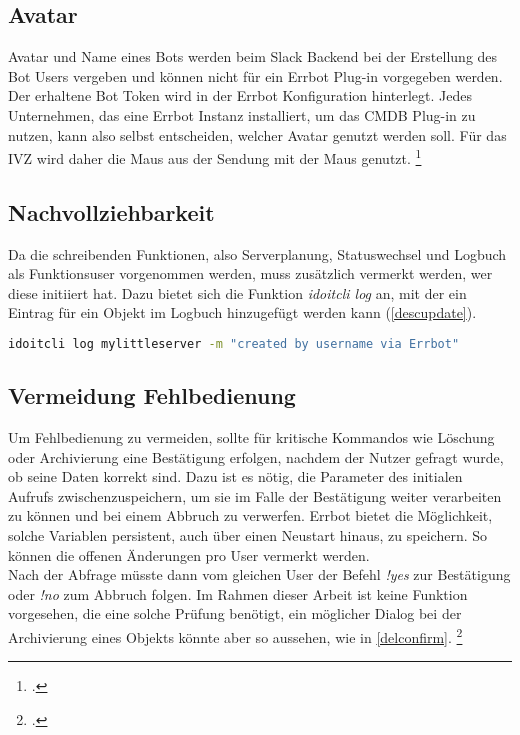 \subsection{Avatar}
Avatar und Name eines Bots werden beim Slack Backend bei der Erstellung des Bot Users vergeben und können nicht für ein Errbot Plug-in vorgegeben werden. Der erhaltene Bot Token wird in der Errbot Konfiguration hinterlegt. Jedes Unternehmen, das eine Errbot Instanz installiert, um das \acs{CMDB} Plug-in zu nutzen, kann also selbst entscheiden, welcher Avatar genutzt werden soll. Für das IVZ wird daher die Maus aus der Sendung mit der Maus genutzt. 
\footcite[Vgl.][o. \pno]{Slack_2019_Bots}

\subsection{Nachvollziehbarkeit} \label{Nachvollziehbarkeit}
Da die schreibenden Funktionen, also Serverplanung, Statuswechsel und Logbuch als Funktionsuser vorgenommen werden, muss zusätzlich vermerkt werden, wer diese initiiert hat. Dazu bietet sich die Funktion \textit{idoitcli log} an, mit der ein Eintrag für ein Objekt im Logbuch hinzugefügt werden kann (\autoref{descupdate}). 

\begin{lstlisting}[language=bash, label=descupdate, caption=Hinzufügen eines Logbuch Eintrages]
idoitcli log mylittleserver -m "created by username via Errbot"
\end{lstlisting}

\subsection{Vermeidung Fehlbedienung}
Um Fehlbedienung zu vermeiden, sollte für kritische Kommandos wie Löschung oder Archivierung eine Bestätigung erfolgen, nachdem der Nutzer gefragt wurde, ob seine Daten korrekt sind. Dazu ist es nötig, die Parameter des initialen Aufrufs zwischenzuspeichern, um sie im Falle der Bestätigung weiter verarbeiten zu können und bei einem Abbruch zu verwerfen. Errbot bietet die Möglichkeit, solche Variablen persistent, auch über einen Neustart hinaus, zu speichern. So können die offenen Änderungen pro User vermerkt werden.\\
Nach der Abfrage müsste dann vom gleichen User der Befehl \textit{!yes} zur Bestätigung oder \textit{!no} zum Abbruch folgen. Im Rahmen dieser Arbeit ist keine Funktion vorgesehen, die eine solche Prüfung benötigt, ein möglicher Dialog bei der Archivierung eines Objekts könnte aber so aussehen, wie in \autoref{delconfirm}. 
\footcite[Vgl.][o. \pno]{errbot_2018_persistence}


